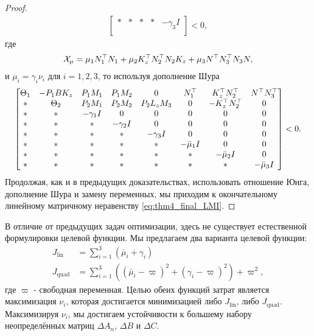 \begin{proof}
\begin{multline}
\begin{bmatrix}
 			*&*&*&*&-\gamma_3{I}\\
 		\end{bmatrix} 
 		<0,
 	\end{multline}
 	где
 	\begin{equation}
 		\mathcal{X}_{\mu}=\mu_1{N}_1^\top{N}_1 +\mu_2{K}_z^\top{N}_2^\top{N}_2{K}_z+\mu_3{N}^\top{N}_3^\top{N}_3{N},
 	\end{equation}
 	и $\mu_i=\gamma_i\nu_i$ для $i=1,2,3$, то используя дополнение Шура
 	\begin{equation}
 		\label{eq:thm4_after_Schur}
 		\begin{bmatrix}
 			{\Theta}_1 & -{P}_1{B}{K}_z & {P}_1{M}_1 & {P}_1{M}_2 & 0 & {N}_1^\top & {K}_z^\top{N}_2^\top & {N}^\top{N}_3^\top 
 			\\
 			* & {\Theta}_2 & {P}_2{M}_1 & {P}_2{M}_2 & {P}_2{L}_z{M}_3&0& -{K}_z^\top{N}_2^\top& 0\\
 			* & * & -\gamma_1{I} & 0&0&0&0&0\\
 			* & * & * & -\gamma_2{I}&0&0&0&0\\
 			* & * & * & *&-\gamma_3{I}&0&0&0\\
 			* & * & * & *&*&-\bar{\mu}_1{I}&0&0\\
 			* & * & * & *&*&*&-\bar{\mu}_2{I}&0\\
 			*&* & * & * & *&*&*&-\bar{\mu}_3{I}\\
 		\end{bmatrix}<0.
 	\end{equation}
 	Продолжая, как и в предыдущих доказательствах, использовать отношение Юнга, дополнение Шура и замену переменных, мы приходим к окончательному линейному матричному неравенству \eqref{eq:thm4_final_LMI}.
 \end{proof}
 В отличие от предыдущих задач оптимизации, здесь не существует естественной формулировки целевой функции. Мы предлагаем два варианта целевой функции:
 \begin{align}
 	\label{eq:cost_lin}
 	J_\text{lin} &= \sum_{i=1}^{3}\left(\bar{\mu}_i+\gamma_i\right) \\ 
 	\label{eq:cost_quad}
 	J_\text{quad} & =  \sum_{i=1}^{3}\left((\bar{\mu}_i-\varpi)^2+(\gamma_i-\varpi)^2\right) + \varpi^2,
 \end{align}
 где $\varpi$ - свободная переменная. Целью обеих функций затрат является максимизация $\nu_i$, которая достигается минимизацией либо $J_\text{lin}$, либо $J_\text{quad}$. Максимизируя $\nu_i$, мы достигаем устойчивости к большему набору неопределённых матриц $\Delta {A}_n$, $\Delta {B}$ и $\Delta {C}$.
 
